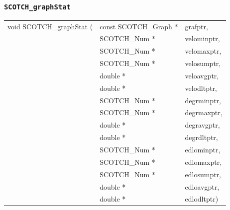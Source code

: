 \subsubsection{{\tt SCOTCH\_graphStat}}

\begin{itemize}
\progsyn

{\tt\begin{tabular}{l@{}ll}
void SCOTCH\_graphStat ( & const SCOTCH\_Graph * & grafptr,    \\
                         & SCOTCH\_Num *         & velominptr, \\
                         & SCOTCH\_Num *         & velomaxptr, \\
                         & SCOTCH\_Num *         & velosumptr, \\
                         & double *              & veloavgptr, \\
                         & double *              & velodltptr, \\
                         & SCOTCH\_Num *         & degrminptr, \\
                         & SCOTCH\_Num *         & degrmaxptr, \\
                         & double *              & degravgptr, \\
                         & double *              & degrdltptr, \\
                         & SCOTCH\_Num *         & edlominptr, \\
                         & SCOTCH\_Num *         & edlomaxptr, \\
                         & SCOTCH\_Num *         & edlosumptr, \\
                         & double *              & edloavgptr, \\
                         & double *              & edlodltptr)
\end{tabular}}


\end{itemize}
